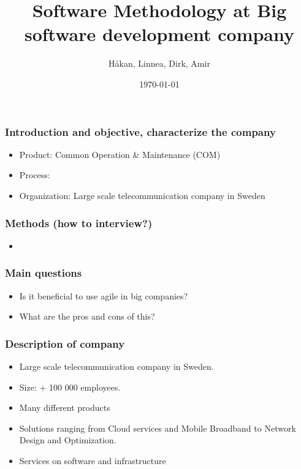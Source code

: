\documentclass{beamer}
\begin{document}



\title{Software Methodology at Big software development company}
\author{H\aa kan, Linnea, Dirk, Amir}

\date{\today}

\begin{frame}
\titlepage
\end{frame}

\begin{frame}\frametitle{Introduction and objective, characterize the company}
\begin{itemize}
\item Product: Common Operation \& Maintenance (COM)
\item Process:
\item Organization: Large scale telecommunication company in Sweden
\end{itemize}
\end{frame}

\begin{frame}
  \frametitle{Methods (how to interview?)}
  \begin{itemize}
  \item
  \end{itemize}
\end{frame}

\begin{frame}
  \frametitle{Main questions}
  \begin{itemize}
  \item Is it beneficial to use agile in big companies?
  \item What are the pros and cons of this?
  \end{itemize}
\end{frame}

\begin{frame}
  \frametitle{Description of company}
  \begin{itemize}
  \item  Large scale telecommunication company in Sweden.
  \item Size: + 100 000 employees.
  \item Many different products
  \item Solutions ranging from Cloud services and Mobile Broadband to Network Design and Optimization.
  \item Services on software and infrastructure
  
  \end{itemize}
\end{frame}
\end{document}
